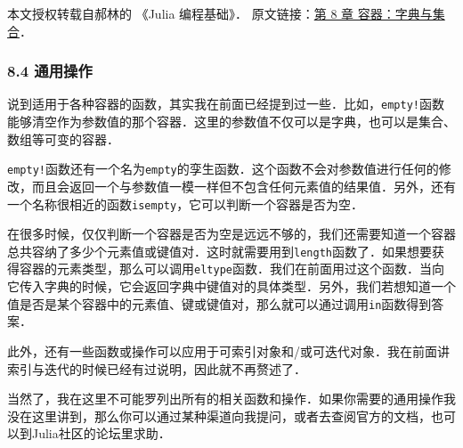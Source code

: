 
本文授权转载自郝林的 《Julia 编程基础》． 原文链接：\href{https://github.com/hyper0x/JuliaBasics/blob/master/book/ch08.md}{第 8 章 容器：字典与集合}．


\subsubsection{8.4 通用操作}

说到适用于各种容器的函数，其实我在前面已经提到过一些．比如，\verb|empty!|函数能够清空作为参数值的那个容器．这里的参数值不仅可以是字典，也可以是集合、数组等可变的容器．

\verb|empty!|函数还有一个名为\verb|empty|的孪生函数．这个函数不会对参数值进行任何的修改，而且会返回一个与参数值一模一样但不包含任何元素值的结果值．另外，还有一个名称很相近的函数\verb|isempty|，它可以判断一个容器是否为空．

在很多时候，仅仅判断一个容器是否为空是远远不够的，我们还需要知道一个容器总共容纳了多少个元素值或键值对．这时就需要用到\verb|length|函数了．如果想要获得容器的元素类型，那么可以调用\verb|eltype|函数．我们在前面用过这个函数．当向它传入字典的时候，它会返回字典中键值对的具体类型．另外，我们若想知道一个值是否是某个容器中的元素值、键或键值对，那么就可以通过调用\verb|in|函数得到答案．

此外，还有一些函数或操作可以应用于可索引对象和/或可迭代对象．我在前面讲索引与迭代的时候已经有过说明，因此就不再赘述了．

当然了，我在这里不可能罗列出所有的相关函数和操作．如果你需要的通用操作我没在这里讲到，那么你可以通过某种渠道向我提问，或者去查阅官方的文档，也可以到Julia社区的论坛里求助．
